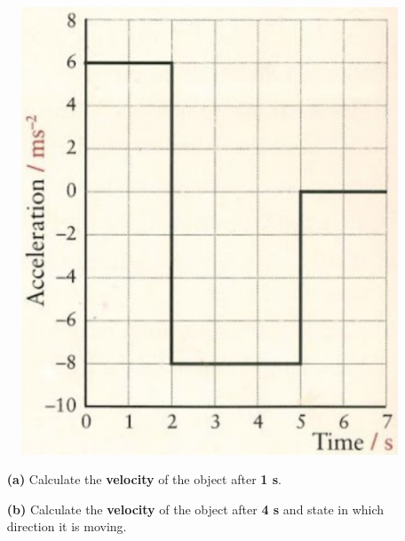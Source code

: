 \documentclass[A4,12pt]{article}
\begin{document}
\begin{enumerate}[label=\bfseries (\arabic*)]
%
\begin{figure}[H]
    \centering
    \includegraphics[scale=0.4]{pag31prob4.png}
    \caption{}
    \label{pag31prob4}
\end{figure}
%
\begin{itemize}
    \item[\bf (a)] Calculate the {\bf velocity} of the object after {\bf 1 s}.
    \item[\bf (b)] Calculate the {\bf velocity} of the object after {\bf 4 s} and state in which direction it is moving. 
\end{itemize}
%
%
%
%
%
%
%
%
%
%
%
%
%
%
%
%
%
%
%
%
%
%
%
%
%
%
%
%
%
%
%
%
%
%
%
%
%
%
%
%
%
%
%
%
%
%
%

\end{enumerate}
\end{document}
